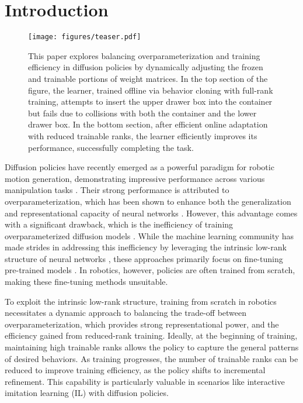 \section{Introduction}
\label{sec:introduction}

\begin{figure}[htbp]
\centering
\texttt{[image: figures/teaser.pdf]}
\caption{This paper explores balancing overparameterization and training efficiency in diffusion policies by dynamically adjusting the frozen and trainable portions of weight matrices. In the top section of the figure, the learner, trained offline via behavior cloning with full-rank training, attempts to insert the upper drawer box into the container but fails due to collisions with both the container and the lower drawer box. In the bottom section, after efficient online adaptation with reduced trainable ranks, the learner efficiently improves its performance, successfully completing the task.}
\label{fig:teaser_img}
\vspace{-0.3cm}
\end{figure}

Diffusion policies have recently emerged as a powerful paradigm for robotic motion generation, demonstrating impressive performance across various manipulation tasks \cite{chi_dp}. Their strong performance is attributed to overparameterization, which has been shown to enhance both the generalization and representational capacity of neural networks \cite{dar_overparam}. However, this advantage comes with a significant drawback, which is the inefficiency of training overparameterized diffusion models \cite{zhang_overparam_dm}. While the machine learning community has made strides in addressing this inefficiency by leveraging the intrinsic low-rank structure of neural networks \cite{li_low_rank, li_low_rank2}, these approaches primarily focus on fine-tuning pre-trained models \cite{hu_lora, dettmers_qlora}. In robotics, however, policies are often trained from scratch, making these fine-tuning methods unsuitable.

To exploit the intrinsic low-rank structure, training from scratch in robotics necessitates a dynamic approach to balancing the trade-off between overparameterization, which provides strong representational power, and the efficiency gained from reduced-rank training. Ideally, at the beginning of training, maintaining high trainable ranks allows the policy to capture the general patterns of desired behaviors. As training progresses, the number of trainable ranks can be reduced to improve training efficiency, as the policy shifts to incremental refinement. This capability is particularly valuable in scenarios like interactive imitation learning (IL) with diffusion policies.



